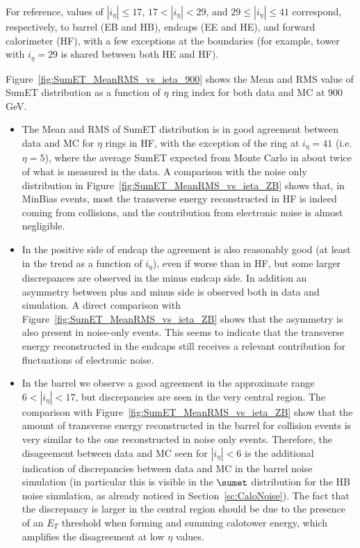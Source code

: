 For reference, values of $|i_{\eta}|\le17$, $17<|i_{\eta}|<29$, and $29\le|i_{\eta}|\le41$ 
correspond, respectively, to barrel (EB and HB), endcaps (EE and HE), and forward 
calorimeter (HF), with a few exceptions at the boundaries 
(for example, tower with $i_{\eta}=29$ is shared between both HE and HF).

Figure~\ref{fig:SumET_MeanRMS_vs_ieta_900} shows the Mean and RMS value of 
SumET distribution as a function of $\eta$ ring index for both data and MC at 900 GeV.
\begin{itemize}
\item The Mean and RMS of SumET distribution is in good agreement between 
data and MC for $\eta$ rings in HF, with the exception 
of the ring at $i_{\eta}=41$ (i.e. $\eta=5$), where the average SumET expected from Monte Carlo 
in about twice of what is measured in the data.
A comparison with the noise only distribution 
in Figure~\ref{fig:SumET_MeanRMS_vs_ieta_ZB} shows that, in MinBias events, 
most the transverse energy reconstructed in HF is indeed coming from collisions, and the contribution
from electronic noise is almost negligible.
\item In the positive side of endcap the agreement is also reasonably good 
(at least in the trend as a function of $i_{\eta}$), even if worse than in HF, 
but some larger discrepances are observed in the minus endcap side.
In addition an asymmetry between plus and minus side is observed both in data and simulation.
A direct comparison with Figure~\ref{fig:SumET_MeanRMS_vs_ieta_ZB} shows that the asymmetry 
is also present in noise-only events. This seems to indicate that the transverse energy reconstructed in the 
endcaps still receives a relevant contribution for fluctuations of electronic noise. 
\item In the barrel we observe a good agreement in the approximate range $6<|i_{\eta}|<17$, 
but discrepancies are seen in the very central region. 
The comparison with Figure~\ref{fig:SumET_MeanRMS_vs_ieta_ZB}
show that the amount of transverse energy reconstructed in the barrel for collision 
events is very similar to the one reconstructed in noise only events. 
Therefore, the disageement between data and MC seen for $|i_{\eta}|<6$
is the additional indication of discrepancies between data and MC in 
the barrel noise simulation (in particular this is visible in the $\sumet$ distribution 
for the HB noise simulation, as already noticed in Section~\ref{sc:CaloNoise}).
The fact that the discrepancy is larger in the central region should be due to 
the presence of an $E_{T}$ threshold when forming and summing calotower energy, 
which amplifies the disagreement at low $\eta$ values. 
\end{itemize}

